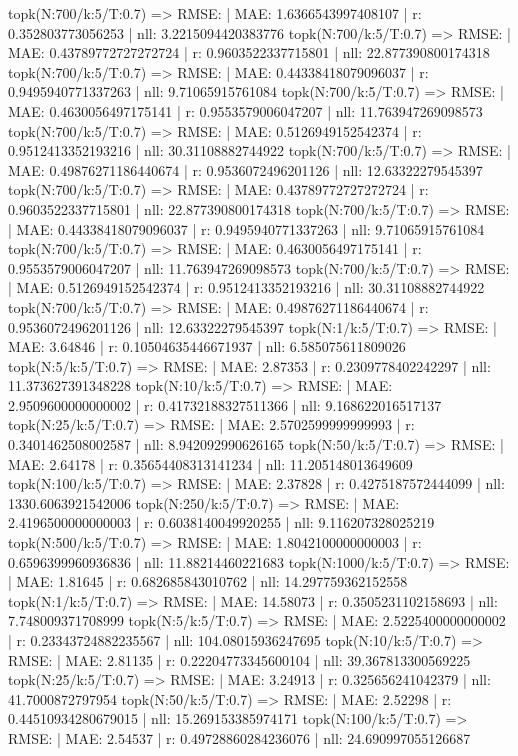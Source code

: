 topk(N:700/k:5/T:0.7) => RMSE: | MAE: 1.6366543997408107 | r: 0.352803773056253 | nll: 3.2215094420383776
topk(N:700/k:5/T:0.7) => RMSE: | MAE: 0.43789772727272724 | r: 0.9603522337715801 | nll: 22.877390800174318
topk(N:700/k:5/T:0.7) => RMSE: | MAE: 0.44338418079096037 | r: 0.9495940771337263 | nll: 9.71065915761084
topk(N:700/k:5/T:0.7) => RMSE: | MAE: 0.4630056497175141 | r: 0.9553579006047207 | nll: 11.763947269098573
topk(N:700/k:5/T:0.7) => RMSE: | MAE: 0.5126949152542374 | r: 0.9512413352193216 | nll: 30.31108882744922
topk(N:700/k:5/T:0.7) => RMSE: | MAE: 0.49876271186440674 | r: 0.9536072496201126 | nll: 12.63322279545397
topk(N:700/k:5/T:0.7) => RMSE: | MAE: 0.43789772727272724 | r: 0.9603522337715801 | nll: 22.877390800174318
topk(N:700/k:5/T:0.7) => RMSE: | MAE: 0.44338418079096037 | r: 0.9495940771337263 | nll: 9.71065915761084
topk(N:700/k:5/T:0.7) => RMSE: | MAE: 0.4630056497175141 | r: 0.9553579006047207 | nll: 11.763947269098573
topk(N:700/k:5/T:0.7) => RMSE: | MAE: 0.5126949152542374 | r: 0.9512413352193216 | nll: 30.31108882744922
topk(N:700/k:5/T:0.7) => RMSE: | MAE: 0.49876271186440674 | r: 0.9536072496201126 | nll: 12.63322279545397
topk(N:1/k:5/T:0.7) => RMSE: | MAE: 3.64846 | r: 0.10504635446671937 | nll: 6.585075611809026
topk(N:5/k:5/T:0.7) => RMSE: | MAE: 2.87353 | r: 0.2309778402242297 | nll: 11.373627391348228
topk(N:10/k:5/T:0.7) => RMSE: | MAE: 2.9509600000000002 | r: 0.41732188327511366 | nll: 9.168622016517137
topk(N:25/k:5/T:0.7) => RMSE: | MAE: 2.5702599999999993 | r: 0.3401462508002587 | nll: 8.942092990626165
topk(N:50/k:5/T:0.7) => RMSE: | MAE: 2.64178 | r: 0.35654408313141234 | nll: 11.205148013649609
topk(N:100/k:5/T:0.7) => RMSE: | MAE: 2.37828 | r: 0.4275187572444099 | nll: 1330.6063921542006
topk(N:250/k:5/T:0.7) => RMSE: | MAE: 2.4196500000000003 | r: 0.6038140049920255 | nll: 9.116207328025219
topk(N:500/k:5/T:0.7) => RMSE: | MAE: 1.8042100000000003 | r: 0.6596399960936836 | nll: 11.88214460221683
topk(N:1000/k:5/T:0.7) => RMSE: | MAE: 1.81645 | r: 0.682685843010762 | nll: 14.297759362152558
topk(N:1/k:5/T:0.7) => RMSE: | MAE: 14.58073 | r: 0.3505231102158693 | nll: 7.748009371708999
topk(N:5/k:5/T:0.7) => RMSE: | MAE: 2.5225400000000002 | r: 0.23343724882235567 | nll: 104.08015936247695
topk(N:10/k:5/T:0.7) => RMSE: | MAE: 2.81135 | r: 0.22204773345600104 | nll: 39.367813300569225
topk(N:25/k:5/T:0.7) => RMSE: | MAE: 3.24913 | r: 0.325656241042379 | nll: 41.7000872797954
topk(N:50/k:5/T:0.7) => RMSE: | MAE: 2.52298 | r: 0.44510934280679015 | nll: 15.269153385974171
topk(N:100/k:5/T:0.7) => RMSE: | MAE: 2.54537 | r: 0.49728860284236076 | nll: 24.690997055126687
